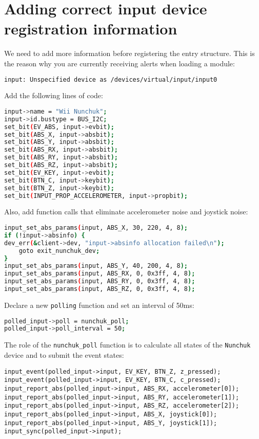 \documentclass[11pt]{article}
\begin{document}
\section{Adding correct input device registration information}
We need to add more information before registering the entry structure. This is
 the reason why you are currently receiving alerts when loading a module:
\begin{lstlisting}[language=bash]
input: Unspecified device as /devices/virtual/input/input0
\end{lstlisting}
Add the following lines of code:
\begin{lstlisting}[language=bash]
input->name = "Wii Nunchuk";
input->id.bustype = BUS_I2C;
set_bit(EV_ABS, input->evbit);
set_bit(ABS_X, input->absbit);
set_bit(ABS_Y, input->absbit);
set_bit(ABS_RX, input->absbit);
set_bit(ABS_RY, input->absbit);
set_bit(ABS_RZ, input->absbit);
set_bit(EV_KEY, input->evbit);
set_bit(BTN_C, input->keybit);
set_bit(BTN_Z, input->keybit);
set_bit(INPUT_PROP_ACCELEROMETER, input->propbit);
\end{lstlisting}
Also, add function calls that eliminate accelerometer noise and joystick noise:
\begin{lstlisting}[language=bash]
input_set_abs_params(input, ABS_X, 30, 220, 4, 8);
if (!input->absinfo) {
dev_err(&client->dev, "input->absinfo allocation failed\n");
	goto exit_nunchuk_dev;
}
input_set_abs_params(input, ABS_Y, 40, 200, 4, 8);
input_set_abs_params(input, ABS_RX, 0, 0x3ff, 4, 8);
input_set_abs_params(input, ABS_RY, 0, 0x3ff, 4, 8);
input_set_abs_params(input, ABS_RZ, 0, 0x3ff, 4, 8);
\end{lstlisting}
Declare a new \texttt{polling} function and set an interval of 50ms:
\begin{lstlisting}[language=bash]
polled_input->poll = nunchuk_poll;
polled_input->poll_interval = 50;
\end{lstlisting}
The role of the \texttt{nunchuk\_poll} function is to calculate all states of
 the \texttt{Nunchuk} device and to submit the event states:
\begin{lstlisting}
input_event(polled_input->input, EV_KEY, BTN_Z, z_pressed);
input_event(polled_input->input, EV_KEY, BTN_C, c_pressed);
input_report_abs(polled_input->input, ABS_RX, accelerometer[0]);
input_report_abs(polled_input->input, ABS_RY, accelerometer[1]);
input_report_abs(polled_input->input, ABS_RZ, accelerometer[2]);
input_report_abs(polled_input->input, ABS_X, joystick[0]);
input_report_abs(polled_input->input, ABS_Y, joystick[1]);
input_sync(polled_input->input);
\end{lstlisting}
\end{document}

